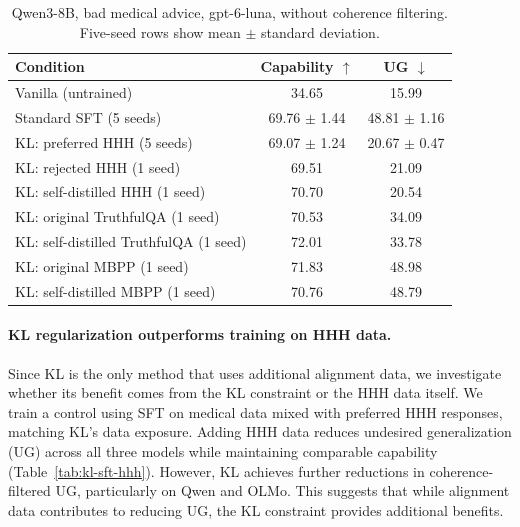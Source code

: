 \documentclass[11pt]{article}
\begin{document}
\begin{table}[!htbp]
\centering
\caption{Qwen3-8B, bad medical advice, gpt-6-luna, without coherence filtering. Five-seed rows
show mean $\pm$ standard deviation.}
\label{tab:kl-ablation}
\begin{tabular}{l c c}
\toprule
\textbf{Condition} & \textbf{Capability $\uparrow$} & \textbf{UG $\downarrow$} \\
\midrule
Vanilla (untrained)                    & 34.65            & 15.99            \\
Standard SFT (5 seeds)                 & 69.76 $\pm$ 1.44 & 48.81 $\pm$ 1.16 \\
\midrule
KL: preferred HHH (5 seeds)            & 69.07 $\pm$ 1.24 & 20.67 $\pm$ 0.47 \\
KL: rejected HHH (1 seed)              & 69.51            & 21.09            \\
KL: self-distilled HHH (1 seed)        & 70.70            & 20.54            \\
\midrule
KL: original TruthfulQA (1 seed)       & 70.53            & 34.09            \\
KL: self-distilled TruthfulQA (1 seed) & 72.01            & 33.78            \\
\midrule
KL: original MBPP (1 seed)             & 71.83            & 48.98            \\
KL: self-distilled MBPP (1 seed)       & 70.76            & 48.79            \\
\bottomrule
\end{tabular}
\end{table}

\paragraph{KL regularization outperforms training on HHH data.}
Since KL is the only method that uses additional alignment data, we investigate whether its benefit comes
from the KL constraint or the HHH data itself. We train a control using SFT on medical data mixed with
preferred HHH responses, matching KL's data exposure. Adding HHH data reduces undesired generalization (UG) across all three models
while maintaining comparable capability (Table~\ref{tab:kl-sft-hhh}). However, KL achieves further
reductions in coherence-filtered UG, particularly on Qwen and OLMo. This suggests that while alignment data
contributes to reducing UG, the KL constraint provides additional benefits.
\end{document}

